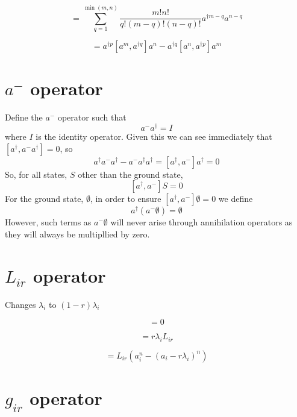 \documentclass[letterpaper,10pt]{article}
\begin{document}
\begin{equation}
[a^n,a^{\dag m}] = \sum_{q=1}^{\min(m,n)} \frac{m!n!}{q!(m-q)!(n-q)!} a^{\dag m-q}a^{n-q}
\end{equation}


\begin{equation}
[a^{\dag p}a^m, a^{\dag q}a^n] = 
a^{\dag p}[a^m, a^{\dag q}] a^n - 
a^{\dag q} [a^n, a^{\dag p}]a^m
\end{equation}

\section{$a^-$ operator}

Define the $a^-$ operator such that
\[
a^-a^\dag = I
\]
where $I$ is the identity operator. Given this we can see immediately that $[a^\dag,a^-a^\dag] = 0$, so
\[
a^\dag a^-a^\dag -a^-a^\dag a^\dag = [a^\dag,a^-]a^\dag = 0
\]
So, for all states, $S$ other than the ground state,
\[
[a^\dag,a^-]S = 0
\]
For the ground state, $\emptyset$, in order to ensure $[a^\dag,a^-]\emptyset = 0$ we define
\[
a^\dag (a^-\emptyset) = \emptyset
\]
However, such terms as $a^-\emptyset$ will never arise through annihilation operators as they will always be multipllied by zero.

\section{$L_{ir}$ operator}

Changes $\lambda_i$ to $(1-r)\lambda_i$

\begin{equation}
[L_{ir}, a_i^\dag] = 0
\end{equation}


\begin{equation}
[L_{ir}, a_i] = r\lambda_i L_{ir}
\end{equation}

\begin{equation}
[L_{ir}, a_i^n] =  L_{ir}(a_i^n - (a_i-r\lambda_i)^n)
\end{equation}

\section{$g_{ir}$ operator}
\end{document}
